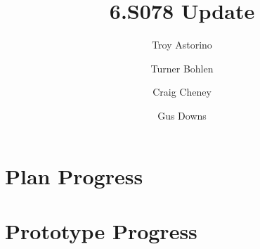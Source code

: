 \documentclass[10pt]{article}
\title{\vspace{-4em}6.S078 Update}
\author{Troy Astorino \and Turner Bohlen \and Craig Cheney \and Gus Downs}
\begin{document}
\maketitle

\section{Plan Progress}

\section{Prototype Progress}
\end{document}
